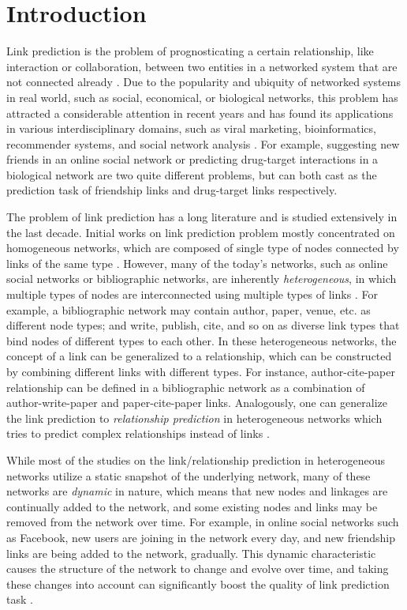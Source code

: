 \section{Introduction}\label{sec:intro}
Link prediction is the problem of prognosticating a certain relationship, like interaction or collaboration, between two entities in a networked system that are not connected already \cite{lu2011link}. Due to the popularity and ubiquity of networked systems in real world, such as social, economical, or biological networks, this problem has attracted a considerable attention in recent years and has found its applications in various interdisciplinary domains, such as viral marketing, bioinformatics, recommender systems, and social network analysis \cite{wasserman1994social}. For example, suggesting new friends in an online social network \cite{liben2007link} or predicting drug-target interactions in a biological network \cite{chen2012drug} are two quite different problems, but can both cast as the prediction task of friendship links and drug-target links respectively.

The problem of link prediction has a long literature and is studied extensively in the last decade. Initial works on link prediction problem mostly concentrated on homogeneous networks, which are composed of single type of nodes connected by links of the same type \cite{liben2007link, wang2007local, lichtenwalter2010new}. However, many of the today's networks, such as online social networks or bibliographic networks, are inherently \emph{heterogeneous}, in which multiple types of nodes are interconnected using multiple types of links \cite{taskar2004link, shi2017survey}. For example, a bibliographic network may contain author, paper, venue, etc. as different node types; and write, publish, cite, and so on as diverse link types that bind nodes of different types to each other. In these heterogeneous networks, the concept of a link can be generalized to a relationship, which can be constructed by combining different links with different types. For instance, author-cite-paper relationship can be defined in a bibliographic network as a combination of author-write-paper and paper-cite-paper links. Analogously, one can generalize the link prediction to \emph{relationship prediction} in heterogeneous networks which tries to predict complex relationships instead of links \cite{sun2012will}.

While most of the studies on the link/relationship prediction in heterogeneous networks utilize a static snapshot of the underlying network, many of these networks are \emph{dynamic} in nature, which means that new nodes and linkages are continually added to the network, and some existing nodes and links may be removed from the network over time. For example, in online social networks such as Facebook, new users are joining in the network every day, and new friendship links are being added to the network, gradually. This dynamic characteristic causes the structure of the network to change and evolve over time, and taking these changes into account can significantly boost the quality of link prediction task \cite{potgieter2009temporality}.

